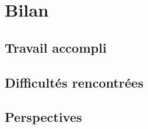 
\section{Bilan}

\subsection{Travail accompli}

\subsection{Difficultés rencontrées}

\subsection{Perspectives}